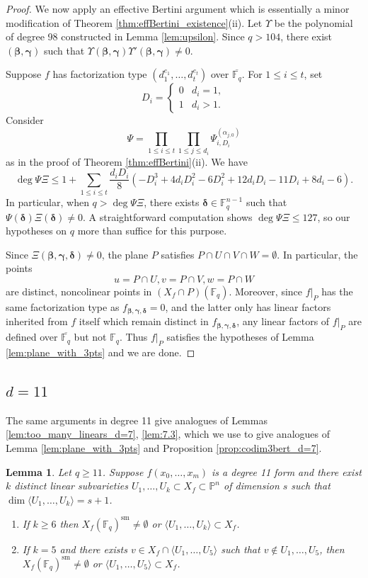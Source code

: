\documentclass{amsart}
\newcommand{\F}{\mathbb{F}}
\renewcommand{\P}{\mathbb{P}}
\newcommand{\Span}[1]{\langle #1 \rangle}
\newcommand{\sm}{\mathrm{sm}}
\renewcommand{\v}{\beta}
\newcommand{\w}{\gamma}
\newcommand{\z}{\delta}
\newcommand{\bv}{\boldsymbol{\v}}
\newcommand{\bw}{\boldsymbol{\w}}
\newcommand{\bz}{\boldsymbol{\z}}
\newcommand{\fvwz}{f_{\bv, \bw, \bz}}
\newtheorem{lemma}[theorem]{Lemma}
\theoremstyle{definition}
\numberwithin{equation}{section}
\numberwithin{table}{section}
\newcommand{\qbound}[1]{{\color{cyan}$q > {#1}$}}
\newcommand{\qboundgeq}[1]{{\color{cyan}$q \geq {#1}$}}
\renewcommand{\qbound}[1]{{$q > {#1}$}}
\renewcommand{\qboundgeq}[1]{{$q \geq {#1}$}}
\begin{document}
\begin{proof}
    We now apply an effective Bertini argument which is essentially a minor modification of Theorem \ref{thm:effBertini_existence}(ii). Let $\Upsilon$ be the polynomial of degree 98 constructed in Lemma \ref{lem:upsilon}. Since \qbound{104}, there exist $(\bv,\bw)$ such that $\Upsilon(\bv,\bw)\Upsilon'(\bv,\bw) \neq 0$. 

    Suppose $f$ has factorization type $(d_1^{e_1},\ldots,d_t^{e_t})$ over $\overline{\F_q}$. For $1 \leq i \leq t$, set
    \[D_i = \begin{cases} 0 & d_i = 1, \\ 1 & d_i > 1. \end{cases}\]
    Consider 
    \[\Psi = \prod_{1 \leq i \leq t} \prod_{1 \leq j \leq d_i}\Psi^{(\alpha_{j,0})}_{i,D_i}\]
    as in the proof of Theorem \ref{thm:effBertini}(ii). We have
    \[\deg \Psi \Xi \leq 1 + \sum_{1 \leq i \leq t} \frac{d_iD_i}{8}\left(-D_i^3 + 4d_iD_i^2 - 6D_i^2 + 12d_iD_i - 11D_i + 8d_i - 6\right).\]
    In particular, when \qbound{\deg \Psi\Xi}, there exists $\bz \in \F_q^{n-1}$ such that $\Psi(\bz)\Xi(\bz) \neq 0$. A straightforward computation shows $\deg \Psi \Xi \leq 127$, so our hypotheses on $q$ more than suffice for this purpose.

    Since $\Xi(\bv,\bw,\bz) \neq 0$, the plane $P$ satisfies $P \cap U \cap V \cap W = \emptyset$. In particular, the points
    \[u = P \cap U, v = P \cap V, w = P \cap W\]
    are distinct, noncolinear points in $(X_f \cap P)(\F_q)$. Moreover, since $f|_P$ has the same factorization type as $\fvwz = 0$, and the latter only has linear factors inherited from $f$ itself which remain distinct in $\fvwz$, any linear factors of $f|_P$ are defined over $\overline{\F_q}$ but not $\F_q$. Thus $f|_P$ satisfies the hypotheses of Lemma \ref{lem:plane_with_3pts} and we are done.
\end{proof}

\subsection{\texorpdfstring{$d=11$}{d=11}}
\label{subsec:d=11}

The same arguments in degree 11 give analogues of Lemmas \ref{lem:too_many_linears_d=7}, \ref{lem:7.3}, which we use to give analogues of Lemma \ref{lem:plane_with_3pts} and Proposition \ref{prop:codim3bert_d=7}.

\begin{lemma}
\label{lem:too_many_linears_d=11}
    Let \qboundgeq{11}. Suppose $f(x_0,\ldots,x_m)$ is a degree 11 form and there exist $k$ distinct linear subvarieties $U_1,\ldots,U_k \subset X_f \subset \P^n$ of dimension $s$ such that $\dim \Span{U_1,\ldots,U_k} = s+1$.
    \begin{enumerate}[label = (\roman*)]
        \item If $k \geq 6$ then $X_f(\F_q)^\sm \neq \emptyset$ or $\Span{U_1,\ldots,U_k} \subset X_f$.
        \item If $k =5$ and there exists $v \in X_f \cap \Span{U_1,\ldots,U_5}$ such that $v \notin U_1,\ldots,U_5$, then $X_f(\F_q)^\sm \neq \emptyset$ or $\Span{U_1,\ldots,U_5} \subset X_f$.
    \end{enumerate}
\end{lemma}
\end{document}
